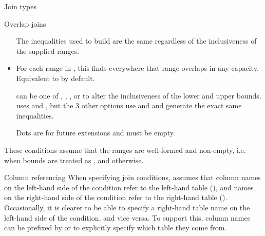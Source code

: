 \documentclass[a4paper]{book}
\begin{document}
\begin{Section}{Join types}
\begin{SubSection}{Overlap joins}
\begin{itemize}
The inequalities used to build  are the same regardless of the
inclusiveness of the supplied ranges.
\item{} 

For each range in , this finds everywhere that range
overlaps  in any capacity. Equivalent to  by default.

 can be one of , \code{"[)"}, \code{"(]"}, or
 to alter the inclusiveness of the lower and upper bounds.
 uses \code{<=} and \code{>=}, but the 3 other options use \code{<} and \code{>}
and generate the exact same inequalities.

Dots are for future extensions and must be empty.

\end{itemize}


These conditions assume that the ranges are well-formed and non-empty, i.e.
 when bounds are treated as , and
 otherwise.
\end{SubSection}

\end{Section}
%
\begin{Section}{Column referencing}
When specifying join conditions,  assumes that column names on the
left-hand side of the condition refer to the left-hand table (), and names
on the right-hand side of the condition refer to the right-hand table ().
Occasionally, it is clearer to be able to specify a right-hand table name on
the left-hand side of the condition, and vice versa. To support this, column
names can be prefixed by  or  to explicitly specify which table they
come from.
\end{Section}
%
\end{document}
